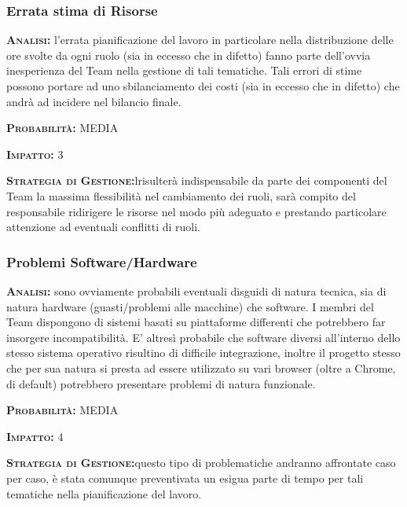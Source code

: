 \subsubsection{Errata stima di Risorse}
\begin{description}
	\item{\scshape\bfseries Analisi:} l'errata pianificazione del lavoro in particolare nella distribuzione delle ore svolte da ogni ruolo (sia in eccesso che in difetto) fanno parte dell'ovvia inesperienza del Team nella gestione di tali tematiche. Tali errori di stime possono portare ad uno sbilanciamento dei costi (sia in eccesso che in difetto) che andrà ad incidere nel bilancio finale.
	\item{\scshape\bfseries Probabilità:} MEDIA
	\item{\scshape\bfseries Impatto:} 3
	\item{\scshape\bfseries Strategia di Gestione:}lrisulterà indispensabile da parte dei componenti del Team la massima flessibilità nel cambiamento dei ruoli, sarà compito del responsabile ridirigere le risorse nel modo più adeguato e prestando particolare attenzione ad eventuali conflitti di ruoli.
\end{description}

\subsubsection{Problemi Software/Hardware}
\begin{description}
	\item{\scshape\bfseries Analisi:} sono ovviamente probabili eventuali disguidi di natura tecnica, sia di natura hardware (guasti/problemi alle macchine) che software. I membri del Team dispongono di sistemi basati su piattaforme differenti che potrebbero far insorgere incompatibilità. E' altresì probabile che software diversi all'interno dello stesso sistema operativo risultino di difficile integrazione, inoltre il progetto stesso che per sua natura si presta ad essere utilizzato su vari browser (oltre a Chrome, di default) potrebbero presentare problemi di natura funzionale.
	\item{\scshape\bfseries Probabilità:} MEDIA
	\item{\scshape\bfseries Impatto:} 4
	\item{\scshape\bfseries Strategia di Gestione:}questo tipo di problematiche andranno affrontate caso per caso, è stata comunque preventivata un esigua parte di tempo per tali tematiche nella pianificazione del lavoro.
\end{description}




